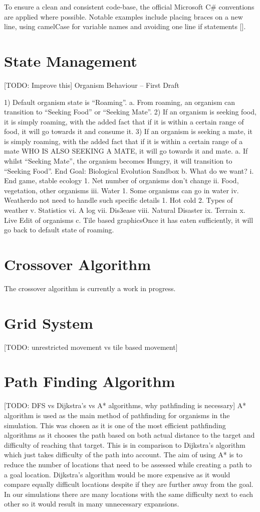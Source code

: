 \documentclass[a4paper, oneside, 11pt]{report}
\begin{document}
To ensure a clean and consistent code-base, the official Microsoft C\# conventions are applied where possible. Notable examples include placing braces on a new line, using camelCase for variable names and avoiding one line if statements [\cite{microsoft}].


\section{State Management}\label{statemanagement}
[TODO: Improve this]
Organism Behaviour – First Draft

1) Default organism state is “Roaming”.
a. From roaming, an organism can transition to “Seeking Food” or “Seeking Mate”.
2) If an organism is seeking food, it is simply roaming, with the added fact that if it is within a certain range of food, it will go towards it and consume it.
3) If an organism is seeking a mate, it is simply roaming, with the added fact that if it is within a certain range of a mate WHO IS ALSO SEEKING A MATE, it will go towards it and mate.
a. If whilst “Seeking Mate”, the organism becomes Hungry, it will transition to “Seeking Food”. End Goal: Biological Evolution Sandbox
b. What do we want?
i. End game, stable ecology
1. Net number of organisms don’t change
ii. Food, vegetation, other organisms
iii. Water
1. Some organisms can go in water
iv. Weatherdo not need to handle such specific details
1. Hot cold
2. Types of weather
v. Statistics
vi. A log
vii. Dis3ease
viii. Natural Disaster
ix. Terrain
x. Live Edit of organisms
c. Tile based graphicsOnce it has eaten sufficiently, it will go back to default state of roaming.

\section{Crossover Algorithm}\label{crossover}
The crossover algorithm is currently a work in progress.

\section{Grid System}\label{grid}
[TODO: unrestricted movement vs tile based movement]

\section{Path Finding Algorithm}\label{pathfinding}
[TODO: DFS vs Dijkstra's vs A* algorithms, why pathfinding is necessary]
A* algorithm is used as the main method of pathfinding for organisms in the simulation. This was chosen as it is one of the most efficient pathfinding algorithms as it chooses the path based on both actual distance to the target and difficulty of reaching that target. This is in comparison to Dijkstra's algorithm which just takes difficulty of the path into account. The aim of using A* is to reduce the number of locations that need to be assessed while creating a path to a goal location. Dijkstra's algorithm would be more expensive as it would compare equally difficult locations despite if they are further away from the goal. In our simulations there are many locations with the same difficulty next to each other so it would result in many unnecessary expansions.
\end{document}
